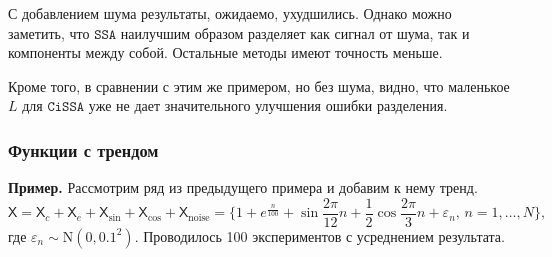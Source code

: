 \documentclass[12pt, specialist, subf
]{disser}
\theoremstyle{definition}
\newcommand{\SSA}{\texttt{SSA}}
\newcommand{\CISSA}{\texttt{CiSSA}}
\newcommand{\TS}{\mathsf{X}}
\begin{document}
С добавлением шума результаты, ожидаемо, ухудшились. Однако можно заметить, что $\SSA$ наилучшим образом разделяет как сигнал от шума, так и компоненты между собой.  Остальные методы имеют точность меньше. 

Кроме того, в сравнении с этим же примером, но без шума, видно, что маленькое $L$ для $\CISSA$ уже не дает значительного улучшения ошибки разделения.

\subsubsection{Функции с трендом}
\label{example:cissa_trend_noise}

\textbf{\large{Пример.}} Рассмотрим ряд из предыдущего примера и добавим к нему тренд. 
\[ 
\TS = \TS_{c} + \TS_e + \TS_{\sin} + \TS_{\cos} + \TS_{\mathrm{noise}}= \{1 + e^{\frac{n}{100}} + \sin{\frac{2\pi}{12}n} + \frac{1}{2}\cos{\frac{2\pi}{3}n} + \varepsilon_n, \, n = 1, \dots, N \},
\]
где $\varepsilon_n \sim \mathrm N(0, 0.1^2)$. Проводилось 100 экспериментов с усреднением результата.
\end{document}

